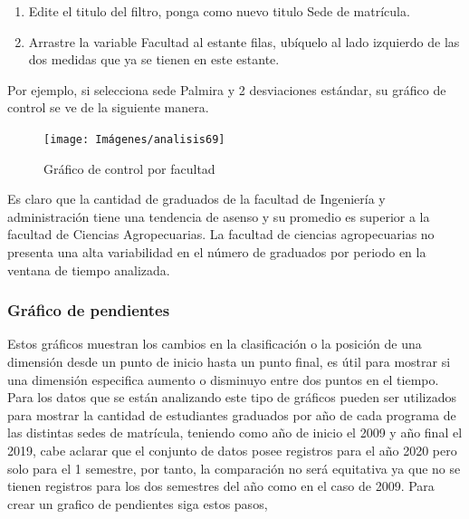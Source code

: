 \documentclass[
]{book}
\begin{document}
\begin{enumerate}
\def\labelenumi{\arabic{enumi}.}
\setcounter{enumi}{4}
\item
  Edite el titulo del filtro, ponga como nuevo titulo Sede de matrícula.
\item
  Arrastre la variable Facultad al estante filas, ubíquelo al lado izquierdo de las dos medidas que ya se tienen en este estante.
\end{enumerate}

Por ejemplo, si selecciona sede Palmira y 2 desviaciones estándar, su gráfico de control se ve de la siguiente manera.

\begin{figure}

{\centering \texttt{[image: Imágenes/analisis69]} 

}

\caption{Gráfico de control por facultad}\label{fig:controlfacultad-fig}
\end{figure}

Es claro que la cantidad de graduados de la facultad de Ingeniería y administración tiene una tendencia de asenso y su promedio es superior a la facultad de Ciencias Agropecuarias. La facultad de ciencias agropecuarias no presenta una alta variabilidad en el número de graduados por periodo en la ventana de tiempo analizada.

\hypertarget{graficopendientes}{%
\subsubsection{Gráfico de pendientes}\label{graficopendientes}}

Estos gráficos muestran los cambios en la clasificación o la posición de una dimensión desde un punto de inicio hasta un punto final, es útil para mostrar si una dimensión especifica aumento o disminuyo entre dos puntos en el tiempo.
Para los datos que se están analizando este tipo de gráficos pueden ser utilizados para mostrar la cantidad de estudiantes graduados por año de cada programa de las distintas sedes de matrícula, teniendo como año de inicio el 2009 y año final el 2019, cabe aclarar que el conjunto de datos posee registros para el año 2020 pero solo para el 1 semestre, por tanto, la comparación no será equitativa ya que no se tienen registros para los dos semestres del año como en el caso de 2009. Para crear un grafico de pendientes siga estos pasos,
\end{document}
